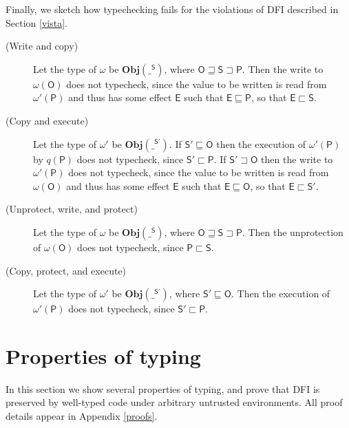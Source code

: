 \documentclass{sigplanconf}
\newcommand{\labp}{\mathsf P}
\newcommand{\labo}{\mathsf O}
\newcommand{\labb}{\mathsf S}
\newcommand{\labt}{\mathsf E}
\begin{document}
Finally, we sketch how typechecking fails for the violations of DFI described in Section \ref{vista}. \begin{description}
\item[{\rm (}Write and copy{\rm )}]


  Let the type of $\omega$ be $\mathbf{Obj}(\_^{\labb})$, where $\labo \sqsupseteq \labb \sqsupset \labp$. 
  Then the write to $\omega(\labo)$ does not typecheck, since the value to be written is read from $\omega'(\labp)$ and thus has some effect $\labt$ such that $\labt \sqsubseteq \labp$, so that $\labt \sqsubset \labb$.
\item[{\rm (}Copy and execute{\rm )}]


  Let the type of $\omega'$ be $\mathbf{Obj}(\_^{\labb'})$. 
  If $\labb' \sqsubseteq \labo$ then the execution of $\omega'(\labp)$ by $q(\labp)$ does not typecheck, since $\labb' \sqsubset \labp$. 
  If $\labb' \sqsupset \labo$ then the write to $\omega'(\labp)$ does not typecheck, since the value to be written is read from $\omega(\labo)$ and thus has some effect $\labt$ such that $\labt \sqsubseteq \labo$, so that $\labt \sqsubset \labb'$.
\item[{\rm (}Unprotect, write, and protect{\rm )}]

  Let the type of $\omega$ be $\mathbf{Obj}(\_^{\labb})$, where $\labo \sqsupseteq \labb \sqsupset \labp$. 
  Then the unprotection of $\omega(\labo)$ does not typecheck, since $\labp \sqsubset \labb$.  
\item[{\rm (}Copy, protect, and execute{\rm )}]

  Let the type of $\omega'$ be $\mathbf{Obj}(\_^{\labb'})$, where $\labb' \sqsubseteq \labo$. 
  Then the execution of $\omega'(\labp)$ does not typecheck, since $\labb' \sqsubset \labp$.
\end{description}



\section{Properties of typing}\label{Results}
In
this section we show several properties of typing, and prove that DFI is preserved by well-typed code under arbitrary untrusted
environments. All proof details appear in Appendix \ref{proofs}.
\end{document}
